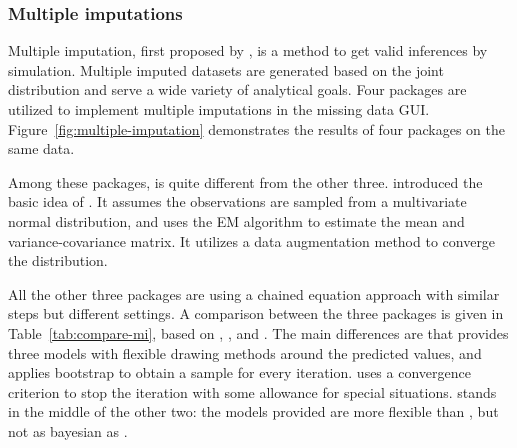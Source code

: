 \documentclass[article]{jss}
\begin{document}
\clearpage
\subsubsection{Multiple imputations}

Multiple imputation, first proposed by \citet{rubin1978multiple}, is a method to get valid inferences by simulation. Multiple imputed datasets are generated based on the joint distribution and serve a wide variety of analytical goals. Four  packages are utilized to implement multiple imputations in the missing data GUI. Figure~\ref{fig:multiple-imputation} demonstrates the results of four packages on the same data. 

Among these packages,  is quite different from the other three. \citet{schafer1998multiple} introduced the basic idea of . It assumes the observations are sampled from a multivariate normal distribution, and uses the EM algorithm to estimate the mean and variance-covariance matrix. It utilizes a data augmentation method to converge the distribution. 

All the other three packages are using a chained equation approach with similar steps but different settings. A comparison between the three packages is given in Table~\ref{tab:compare-mi}, based on \citet{hmisc}, \citet{mice}, and \citet{mi}. The main differences are that  provides three models with flexible drawing methods around the predicted values, and applies bootstrap to obtain a sample for every iteration.  uses a convergence criterion to stop the iteration with some allowance for special situations.  stands in the middle of the other two: the models provided are more flexible than , but not as bayesian as .
\end{document}
